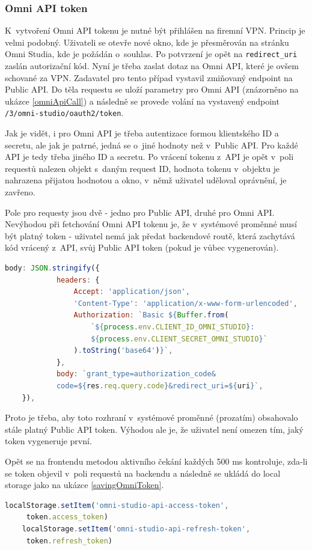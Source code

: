 \documentclass[czech, bc, kiv, he, iso690numb, viewonly]{fasthesis} %
\begin{document}
\subsubsection{Omni API token}
K~vytvoření Omni API tokenu je nutné být přihlášen na firemní VPN. Princip je velmi podobný. Uživateli se otevře nové okno, kde je přesměrován na stránku Omni Studia, kde je požádán
o~souhlas. Po potvrzení je opět na \texttt{redirect\_uri} zaslán autorizační kód. Nyní je třeba zaslat dotaz na Omni API, které je ovšem schované za VPN. Zadavatel pro tento případ
vystavil zmiňovaný endpoint na Public API. Do těla requestu se uloží parametry pro Omni API (znázorněno na ukázce \ref{omniApiCall}) a následně se provede volání na vystavený endpoint
\texttt{/3/omni-studio/oauth2/token}. 

Jak je vidět, i pro Omni API je třeba autentizace formou klientského ID a secretu, ale jak je patrné, jedná se o~jiné hodnoty než v~Public API. Pro každé API
je tedy třeba jiného ID a secretu. Po vrácení tokenu z~API je opět v~poli requestů nalezen objekt s~daným request ID, hodnota tokenu v~objektu je nahrazena přijatou hodnotou a okno, v~němž
uživatel uděloval oprávnění, je zavřeno. 

Pole pro requesty jsou dvě - jedno pro Public API, druhé pro Omni API. Nevýhodou při fetchování Omni API tokenu je, že v~systémové proměnné musí být platný token - uživatel nemá jak předat
backendové routě, která zachytává kód vrácený z~API, svůj Public API token (pokud je vůbec vygenerován). 
\begin{lstlisting}[language=Javascript, caption={Parametry pro Omni API}, label=omniApiCall]
	body: JSON.stringify({
			headers: {
				Accept: 'application/json',
				'Content-Type': 'application/x-www-form-urlencoded',
				Authorization: `Basic ${Buffer.from(
					`${process.env.CLIENT_ID_OMNI_STUDIO}:
					${process.env.CLIENT_SECRET_OMNI_STUDIO}`
				).toString('base64')}`,
			},
			body: `grant_type=authorization_code&
			code=${res.req.query.code}&redirect_uri=${uri}`,
	}),
\end{lstlisting}
Proto je třeba, aby toto rozhraní v~systémové proměnné (prozatím) obsahovalo stále platný 
Public API token. Výhodou ale je, že uživatel není omezen tím, jaký token vygeneruje první.

Opět se na frontendu metodou aktivního čekání každých 500 ms kontroluje, zda-li se token objevil v~poli requestů na backendu a následně se ukládá do local storage jako na ukázce
\ref{savingOmniToken}.

\begin{lstlisting}[language=Javascript, caption={Ukládání Omni API tokenů do local storage}, label=savingOmniToken]
	localStorage.setItem('omni-studio-api-access-token',
	 token.access_token)
	localStorage.setItem('omni-studio-api-refresh-token',
	 token.refresh_token)
\end{lstlisting}
	
\end{document}
